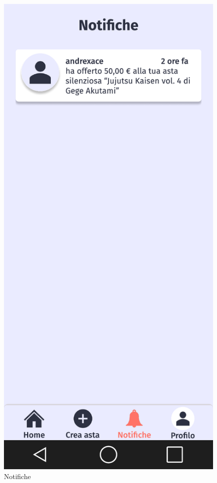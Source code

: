 \begin{figure}[!htb]
\begin{minipage}{0.32\textwidth}
                \includegraphics[width=.7\linewidth]{Immagini/Frames/Venditore/V6.pdf}
                \caption{Notifiche}
            \end{minipage}\hfill
        \end{figure}

    \clearpage

